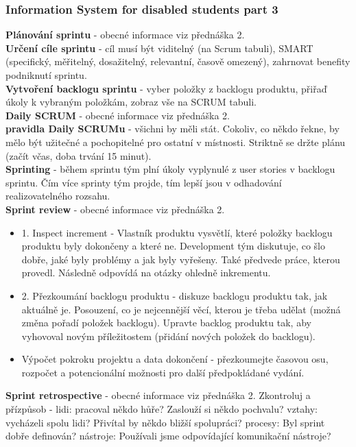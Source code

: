 \documentclass[11pt,a4paper]{article}
\begin{document}
    \subsubsection{Information System for disabled students part 3 \cite{pres-4b}}
        \textbf{Plánování sprintu} - obecné informace viz přednáška 2.\\
        \textbf{Určení cíle sprintu} - cíl musí být viditelný (na Scrum tabuli), SMART (specifický, měřitelný, dosažitelný, relevantní, časově omezený), zahrnovat benefity podniknutí sprintu.\\
        \textbf{Vytvoření backlogu sprintu} - vyber položky z backlogu produktu, přiřaď úkoly k vybraným položkám, zobraz vše na SCRUM tabuli.\\
        \textbf{Daily SCRUM} - obecné informace viz přednáška 2.\\
        \textbf{pravidla Daily SCRUMu} - všichni by měli stát. Cokoliv, co někdo řekne, by mělo být užitečné a pochopitelné pro ostatní v místnosti. Striktně se držte plánu (začít včas, doba trvání 15 minut).\\
        \textbf{Sprinting} - během sprintu tým plní úkoly vyplynulé z user stories v backlogu sprintu. Čím více sprinty tým projde, tím lepší jsou v odhadování realizovatelného rozsahu.\\
        \textbf{Sprint review} - obecné informace viz přednáška 2.
        \begin{itemize}
            \item 1. Inspect increment - Vlastník produktu vysvětlí, které položky backlogu produktu byly dokončeny a které ne. Development tým diskutuje, co šlo dobře, jaké byly problémy a jak byly vyřešeny. Také předvede práce, kterou provedl. Následně odpovídá na otázky ohledně inkrementu.
            \item 2. Přezkoumání backlogu produktu - diskuze backlogu produktu tak, jak aktuálně je. Posouzení, co je nejcennější věcí, kterou je třeba udělat (možná změna pořadí položek backlogu). Upravte backlog produktu tak, aby vyhovoval novým příležitostem (přidání nových položek do backlogu).
            \item Výpočet pokroku projektu a data dokončení - přezkoumejte časovou osu, rozpočet a potencionální možnosti pro další předpokládané vydání.
        \end{itemize}
        \textbf{Sprint retrospective} - obecné informace viz přednáška 2. Zkontroluj a přízpůsob - lidi: pracoval někdo hůře? Zaslouží si někdo pochvalu? vztahy: vycházeli spolu lidi? Přivítal by někdo bližší spolupráci? procesy: Byl sprint dobře definován? nástroje: Používali jsme odpovídající komunikační nástroje?\\
\end{document}
